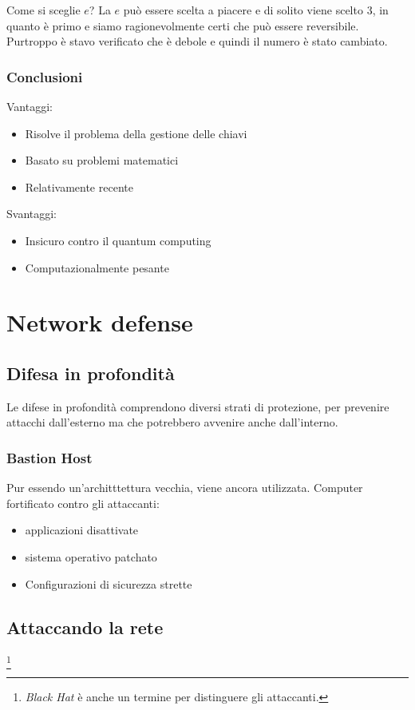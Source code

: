 Come si sceglie $e$? La $e$ può essere scelta a piacere e di solito viene scelto 
$3$, in quanto è primo e siamo ragionevolmente certi che può essere reversibile. 
Purtroppo è stavo verificato che è debole e quindi il numero è stato cambiato.

\subsubsection{Conclusioni}

Vantaggi:
\begin{itemize}
\item Risolve il problema della gestione delle chiavi
\item Basato su problemi matematici
\item Relativamente recente
\end{itemize}

Svantaggi:
\begin{itemize}
\item Insicuro contro il quantum computing
\item Computazionalmente pesante
\end{itemize}


\section{Network defense}

\subsection{Difesa in profondità}

Le difese in profondità comprendono diversi strati di protezione, per prevenire 
attacchi dall'esterno ma che potrebbero avvenire anche dall'interno.

\subsubsection{Bastion Host}

Pur essendo un'architttettura vecchia, viene ancora utilizzata.
Computer fortificato contro gli attaccanti:
\begin{itemize}
\item applicazioni disattivate
\item sistema operativo patchato
\item Configurazioni di sicurezza strette
\end{itemize}

\subsection{Attaccando la rete}\footnote{\textit{Black Hat} è anche un termine 
per distinguere gli attaccanti.}

